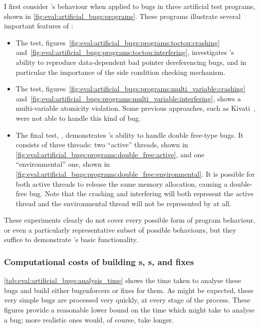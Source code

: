 \noindent
I first consider {\technique}'s behaviour when applied to bugs in
three artificial test programs, shown in
\autoref{fig:eval:artificial_bugs:programs}.  These programs
illustrate several important features of {\technique}:
\begin{itemize}
  \item The  test,
    figures~\ref{fig:eval:artificial_bugs:programs:toctou:crashing}
    and~\ref{fig:eval:artificial_bugs:programs:toctou:interfering},
    investigates {\technique}'s ability to reproduce data-dependent
    bad pointer dereferencing bugs, and in particular the importance
    of the \gls{side condition} checking mechanism.
  \item The  test,
    figures~\ref{fig:eval:artificial_bugs:programs:multi_variable:crashing}
    and~\ref{fig:eval:artificial_bugs:programs:multi_variable:interfering},
    shows a multi-variable atomicity violation.  Some previous
    approaches, such as Kivati~\cite{Chew2010}, were not able to handle
    this kind of bug.
  \item The final test, , demonstrates
    {\technique}'s ability to handle double free-type bugs.  It
    consists of three threads: two ``active'' threads, shown in
    \autoref{fig:eval:artificial_bugs:programs:double_free:active},
    and one ``environmental'' one, shown in
    \autoref{fig:eval:artificial_bugs:programs:double_free:environmental}.
    It is possible for both active threads to release the same memory
    allocation, causing a double-free bug.  Note that the crashing and
    interfering {\StateMachines} will both represent the active thread
    and the environmental thread will not be represented by
    {\AStateMachine} at all.
\end{itemize}
These experiments clearly do not cover every possible form of program
behaviour, or even a particularly representative subset of possible
behaviours, but they suffice to demonstrate {\technique}'s basic
functionality.

\subsubsection{Computational costs of building s, s, and fixes}

\autoref{tab:eval:artificial_bugs:analysis_time} shows the time taken
to analyse these bugs and build either \glspl{bugenforcer} or fixes
for them.  As might be expected, these very simple bugs are processed
very quickly, at every stage of the process.  These figures provide a
reasonable lower bound on the time which {\technique} might take
to analyse a bug; more realistic ones would, of course, take longer.

